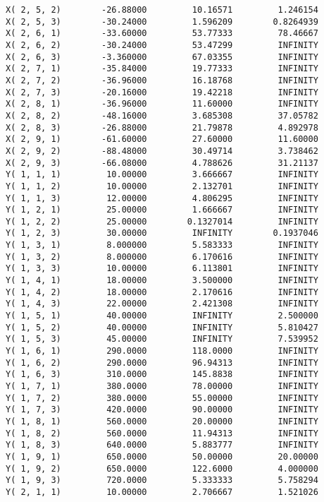 \documentclass[12pt]{article}
\begin{document}
\begin{appendices}
\begin{lstlisting}
X( 2, 5, 2)        -26.88000         10.16571         1.246154
X( 2, 5, 3)        -30.24000         1.596209        0.8264939
X( 2, 6, 1)        -33.60000         53.77333         78.46667
X( 2, 6, 2)        -30.24000         53.47299         INFINITY
X( 2, 6, 3)        -3.360000         67.03355         INFINITY
X( 2, 7, 1)        -35.84000         19.77333         INFINITY
X( 2, 7, 2)        -36.96000         16.18768         INFINITY
X( 2, 7, 3)        -20.16000         19.42218         INFINITY
X( 2, 8, 1)        -36.96000         11.60000         INFINITY
X( 2, 8, 2)        -48.16000         3.685308         37.05782
X( 2, 8, 3)        -26.88000         21.79878         4.892978
X( 2, 9, 1)        -61.60000         27.60000         11.60000
X( 2, 9, 2)        -88.48000         30.49714         3.738462
X( 2, 9, 3)        -66.08000         4.788626         31.21137
Y( 1, 1, 1)         10.00000         3.666667         INFINITY
Y( 1, 1, 2)         10.00000         2.132701         INFINITY
Y( 1, 1, 3)         12.00000         4.806295         INFINITY
Y( 1, 2, 1)         25.00000         1.666667         INFINITY
Y( 1, 2, 2)         25.00000        0.1327014         INFINITY
Y( 1, 2, 3)         30.00000         INFINITY        0.1937046
Y( 1, 3, 1)         8.000000         5.583333         INFINITY
Y( 1, 3, 2)         8.000000         6.170616         INFINITY
Y( 1, 3, 3)         10.00000         6.113801         INFINITY
Y( 1, 4, 1)         18.00000         3.500000         INFINITY
Y( 1, 4, 2)         18.00000         2.170616         INFINITY
Y( 1, 4, 3)         22.00000         2.421308         INFINITY
Y( 1, 5, 1)         40.00000         INFINITY         2.500000
Y( 1, 5, 2)         40.00000         INFINITY         5.810427
Y( 1, 5, 3)         45.00000         INFINITY         7.539952
Y( 1, 6, 1)         290.0000         118.0000         INFINITY
Y( 1, 6, 2)         290.0000         96.94313         INFINITY
Y( 1, 6, 3)         310.0000         145.8838         INFINITY
Y( 1, 7, 1)         380.0000         78.00000         INFINITY
Y( 1, 7, 2)         380.0000         55.00000         INFINITY
Y( 1, 7, 3)         420.0000         90.00000         INFINITY
Y( 1, 8, 1)         560.0000         20.00000         INFINITY
Y( 1, 8, 2)         560.0000         11.94313         INFINITY
Y( 1, 8, 3)         640.0000         5.883777         INFINITY
Y( 1, 9, 1)         650.0000         50.00000         20.00000
Y( 1, 9, 2)         650.0000         122.6000         4.000000
Y( 1, 9, 3)         720.0000         5.333333         5.758294
Y( 2, 1, 1)         10.00000         2.706667         1.521026

\end{lstlisting}
\end{appendices}
\end{document}
